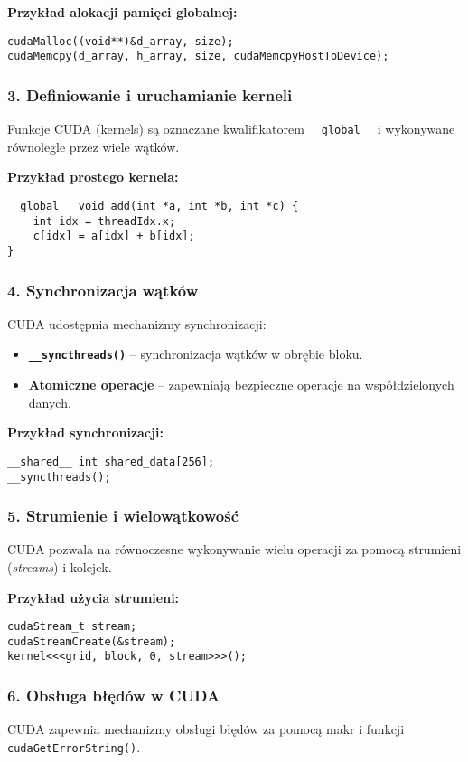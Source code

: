 \textbf{Przykład alokacji pamięci globalnej:}
\begin{verbatim}
cudaMalloc((void**)&d_array, size);
cudaMemcpy(d_array, h_array, size, cudaMemcpyHostToDevice);
\end{verbatim}

\subsubsection{3. Definiowanie i uruchamianie kerneli}
Funkcje CUDA (kernels) są oznaczane kwalifikatorem \texttt{\_\_global\_\_} i wykonywane równolegle przez wiele wątków.

\textbf{Przykład prostego kernela:}
\begin{verbatim}
__global__ void add(int *a, int *b, int *c) {
    int idx = threadIdx.x;
    c[idx] = a[idx] + b[idx];
}
\end{verbatim}

\subsubsection{4. Synchronizacja wątków}
CUDA udostępnia mechanizmy synchronizacji:
\begin{itemize}
    \item \textbf{\texttt{\_\_syncthreads()}} – synchronizacja wątków w obrębie bloku.
    \item \textbf{Atomiczne operacje} – zapewniają bezpieczne operacje na współdzielonych danych.
\end{itemize}

\textbf{Przykład synchronizacji:}
\begin{verbatim}
__shared__ int shared_data[256];
__syncthreads();
\end{verbatim}

\subsubsection{5. Strumienie i wielowątkowość}
CUDA pozwala na równoczesne wykonywanie wielu operacji za pomocą strumieni (\textit{streams}) i kolejek.

\textbf{Przykład użycia strumieni:}
\begin{verbatim}
cudaStream_t stream;
cudaStreamCreate(&stream);
kernel<<<grid, block, 0, stream>>>();
\end{verbatim}

\subsubsection{6. Obsługa błędów w CUDA}
CUDA zapewnia mechanizmy obsługi błędów za pomocą makr i funkcji \texttt{cudaGetErrorString()}.

